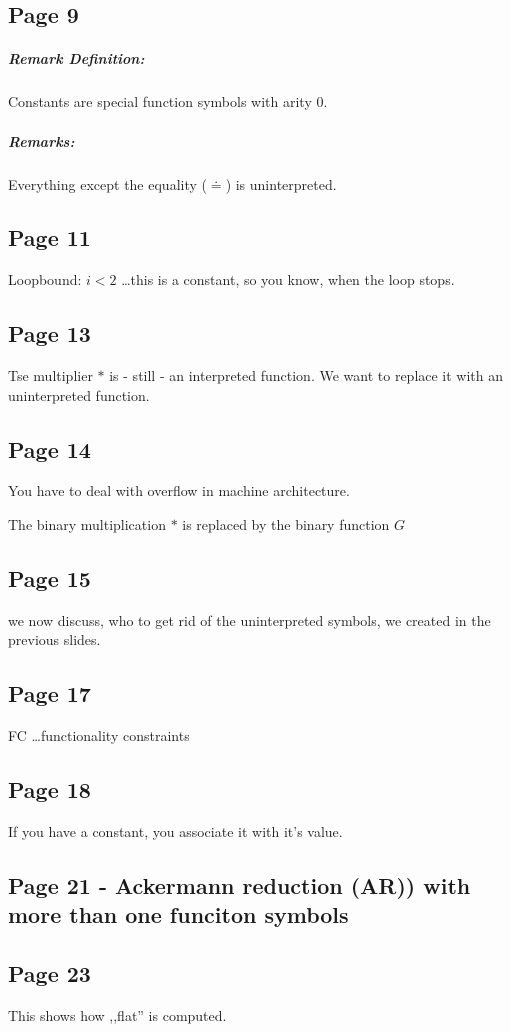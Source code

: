 \documentclass[a4paper]{article}
\begin{document}
\subsection{Page 9}

\subparagraph{Remark Definition:} Constants are special function symbols with
arity 0.

\subparagraph{Remarks:} Everything except the equality ($ \doteq $) is
uninterpreted.

\subsection{Page 11}

Loopbound: $i<2$ \ldots this is a constant, so you know, when the loop stops.


\subsection{Page 13}
Tse multiplier $*$ is - still - an interpreted function. We want to replace it
with an uninterpreted function.

\subsection{Page 14} You have to deal with overflow in machine architecture.

The binary multiplication $*$ is replaced by the binary function $G$

\subsection{Page 15} we now discuss, who to get rid of the uninterpreted
symbols, we created in the previous slides.

\subsection{Page 17}
FC \ldots functionality constraints

\subsection{Page 18}
If you have a constant, you associate it with it's value.


\subsection{Page 21 - Ackermann reduction (AR)) with more than one funciton
symbols} \subsection{Page 23} This shows how ,,flat'' is computed.
\end{document}
